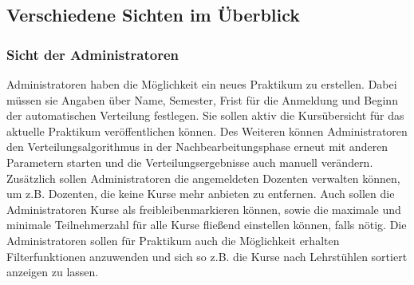             
                    
        \subsection{Verschiedene Sichten im Überblick}
        \label{Sichten}
            \subsubsection{Sicht der Administratoren}
                Administratoren haben die Möglichkeit ein neues Praktikum zu erstellen.
                Dabei müssen sie Angaben über Name, Semester, Frist für die Anmeldung und Beginn der automatischen Verteilung festlegen.
                Sie sollen aktiv die Kursübersicht für das aktuelle Praktikum veröffentlichen können.
                Des Weiteren können Administratoren den Verteilungsalgorithmus in der Nachbearbeitungsphase erneut mit anderen Parametern starten und die Verteilungsergebnisse auch manuell verändern.
                Zusätzlich sollen Administratoren die angemeldeten Dozenten verwalten können, um z.B. Dozenten, die keine Kurse mehr anbieten zu entfernen.
                Auch sollen die Administratoren Kurse als \glqq freibleiben\grqq markieren können, sowie die maximale und minimale Teilnehmerzahl für alle Kurse fließend einstellen können, falls nötig.
                Die Administratoren sollen für Praktikum auch die Möglichkeit erhalten Filterfunktionen anzuwenden und sich so z.B. die Kurse nach Lehrstühlen sortiert anzeigen zu lassen.
    
